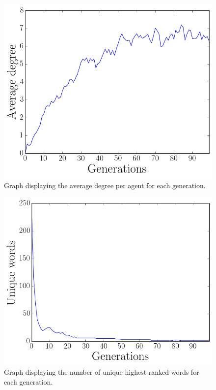 \begin{figure}[htbp]
    \centering
    \includegraphics[scale=0.5]{fig/Results/Exp7/Degree1}
    \caption{Graph displaying the average degree per agent for each generation.}
    \label{fig:Degree7}
\end{figure}
\begin{figure}[htbp]
    \centering
    \includegraphics[scale=0.5]{fig/Results/Exp7/UniqueWords1}
    \caption{Graph displaying the number of unique highest ranked words for each generation.}
    \label{fig:UniqueWords7}
\end{figure}
